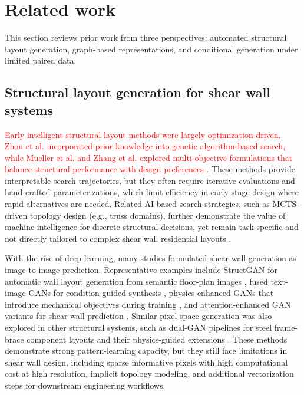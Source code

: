 \section{Related work}
\label{sec:related}

This section reviews prior work from three perspectives: automated structural layout generation, graph-based representations, and conditional generation under limited paired data.

\subsection{Structural layout generation for shear wall systems}
\label{subsec:structural_layout_generation}

\textcolor{red}{Early intelligent structural layout methods were largely optimization-driven. Zhou et al. incorporated prior knowledge into genetic algorithm-based search\cite{zhouAutomatedStructuralDesign2022b}, while Mueller et al. and Zhang et al. explored multi-objective formulations that balance structural performance with design preferences \cite{muellerCombiningStructuralPerformance2015,zhangShearWallLayout2017}.} These methods provide interpretable search trajectories, but they often require iterative evaluations and hand-crafted parameterizations, which limit efficiency in early-stage design where rapid alternatives are needed. Related AI-based search strategies, such as MCTS-driven topology design (e.g., truss domains), further demonstrate the value of machine intelligence for discrete structural decisions, yet remain task-specific and not directly tailored to complex shear wall residential layouts \cite{luoAlphaTrussMonteCarlo2022a,hayashiGraphbasedReinforcementLearning2022}.

With the rise of deep learning, many studies formulated shear wall generation as image-to-image prediction. Representative examples include StructGAN for automatic wall layout generation from semantic floor-plan images \cite{liaoAutomatedStructuralDesign2021a}, fused text-image GANs for condition-guided synthesis \cite{liaoIntelligentGenerativeStructural2022a}, physics-enhanced GANs that introduce mechanical objectives during training \cite{luIntelligentStructuralDesign2022a}, and attention-enhanced GAN variants for shear wall prediction \cite{zhaoIntelligentDesignShear2023}. Similar pixel-space generation was also explored in other structural systems, such as dual-GAN pipelines for steel frame-brace component layouts and their physics-guided extensions \cite{fuDualGenerativeAdversarial2023,fuPhysicalRuleguidedGenerative2024}. These methods demonstrate strong pattern-learning capacity, but they still face limitations in shear wall design, including sparse informative pixels with high computational cost at high resolution, implicit topology modeling, and additional vectorization steps for downstream engineering workflows.

